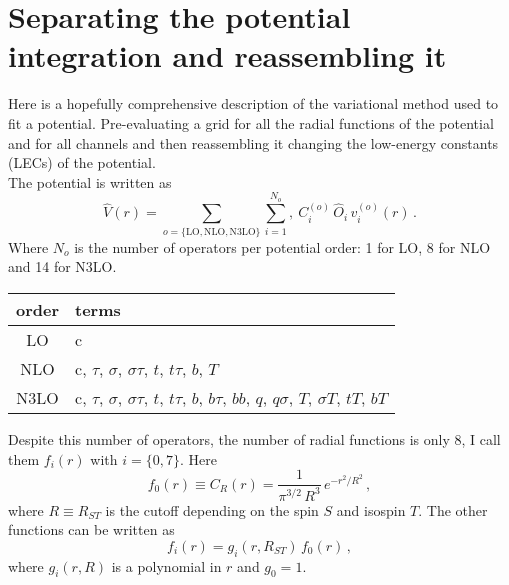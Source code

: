 \documentclass[10pt,a4paper]{article}
\newcommand{\mtm}[1]{\mathrm{#1}}
\begin{document}
	 \section{Separating the potential integration and reassembling it}
	 Here is a hopefully comprehensive description of the variational method used to fit a potential. Pre-evaluating a grid for all the radial functions of the potential and for all channels and then reassembling it changing the low-energy constants (LECs) of the potential.
	 \\
	 The potential is written as
	 \begin{equation}
	 	\hat{V}(r) = \sum_{o=\{\mtm{LO},\mtm{NLO},\mtm{N3LO}\}}\sum_{i=1}^{N_o},\
	 	C_i^{(o)}\,\hat{O}_i\,
	 	v_i^{(o)}(r)\,.
	 	\label{potential_expanded}
	 \end{equation}
	 Where $N_o$ is the number of operators per potential order: 1 for LO, 8 for NLO and 14 for N3LO. 
	 \begin{center}
	 	\begin{tabular}{c|l}
	 		\hline
	 		order & terms\\\hline
	 		LO & c \\
	 		NLO & c, $\tau$, $\sigma$, $\sigma\tau$, 
	 		$t$, $t\tau$, $b$, $T$\\
	 		N3LO & c, $\tau$, $\sigma$, $\sigma\tau$, 
	 		$t$, $t\tau$, $b$, $b\tau$, $bb$, $q$, $q\sigma$, $T$, $\sigma T$, $t T$, $b T$\\
	 		\hline
	 	\end{tabular}
	 \end{center}
	 Despite this number of operators, the number of radial functions is only 8, I call them $f_i(r)$ with $i=\{0,7\}$. Here
	 \begin{equation}
	 	f_0(r) \equiv C_R(r) = \frac{1}{\pi^{3/2}\,R^3}\,e^{-r^2/R^2}\,,
	 \end{equation}
	 where $R\equiv R_{ST}$ is the cutoff depending on the spin $S$ and isospin $T$. The other functions can be written as
	 \begin{equation}
	 	f_{i}(r) = g_i(r,R_{ST})\,f_0(r)\,,
	 \end{equation}
	 where $g_i(r,R)$ is a polynomial in $r$ and $g_0 = 1$.\\
	 \newcommand{\LO}{\mtm{LO}}
	 \newcommand{\NLO}{\mtm{NLO}}
	 \newcommand{\NNNLO}{\mtm{N3LO}}
\end{document}
